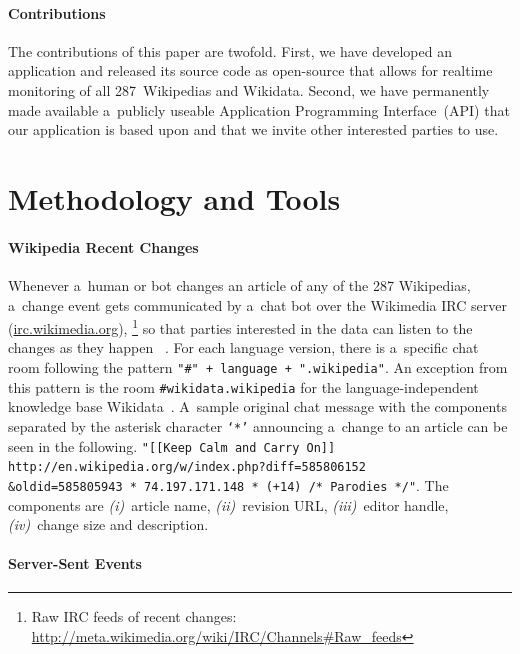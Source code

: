 \documentclass{sig-alternate-2013}
\newcommand{\inlinelistingsize}{\fontsize{8pt}{11pt}}
\let\oldurl\url
\renewcommand{\url}[1]{\inlinelistingsize\oldurl{#1}}
\begin{document}
\paragraph{Contributions}

The contributions of this paper are twofold.
First, we have developed an application
and released its source code as open-source
that allows for realtime monitoring of all 287~Wikipedias and Wikidata.
Second, we have permanently made available a~publicly useable
Application Programming Interface~(API) that our application
is based upon and that we invite other interested parties to use.

\section{Methodology and Tools}

\paragraph{Wikipedia Recent Changes}
\label{sec:wikipedia-recent-changes}

Whenever a~human or bot changes an article
of any of the 287 Wikipedias,
a~change event gets communicated by a~chat bot
over the Wikimedia IRC server (\url{irc.wikimedia.org}),%
\footnote{Raw IRC feeds of recent changes:
\url{http://meta.wikimedia.org/wiki/IRC/Channels\#Raw_feeds}}
so that parties interested in the data
can listen to the changes as they happen%
~\cite{steiner2013mjnomore}.
For each language version, there is
a~specific chat room following the pattern
\texttt{"\#" + language + ".wikipedia"}.
An exception from this pattern is the room
\texttt{\#wikidata.wikipedia} for the language-independent
knowledge base Wikidata~\cite{vrandecic2012wikidata}.
A~sample original chat message with the components separated
by the asterisk character \texttt{`*'}
announcing a~change to an article
can be seen in the following.
\texttt{"[[Keep Calm and Carry On]] http://en.wikipedia.org/w/index.php?diff=585806152\\\&oldid=585805943 * 74.197.171.148 * (+14) /* Paro\-dies */"}.
The components are \emph{(i)}~article name, \emph{(ii)}~revision URL,
\emph{(iii)}~editor handle,
\emph{(iv)}~change size and description.

\paragraph{Server-Sent Events}
\end{document}
